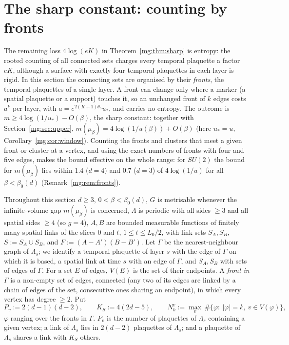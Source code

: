 \documentclass[11pt,a4paper]{article}
\theoremstyle{definition}
\theoremstyle{remark}
\begin{document}
\section{The sharp constant: counting by fronts}\label{mg:sec:fronts}

The remaining loss $4\log(eK)$ in Theorem~\ref{mg:thm:sharp} is entropy: the rooted counting of all connected sets charges every
temporal plaquette a factor $eK$, although a surface with exactly four temporal plaquettes in each layer is rigid. In this section the
connecting sets are organised by their \emph{fronts}, the temporal plaquettes of a single layer. A front can change only where a marker (a
spatial plaquette or a support) touches it, so an unchanged front of $k$ edges costs $a^k$ per layer, with $a=e^{2(K+1)\theta_5}u_*$, and
carries no entropy. The outcome is $m\ge4\log(1/u_*)-O(\beta)$, the sharp constant: together with Section~\ref{mg:sec:upper},
$m(\mu_\beta)=4\log(1/u(\beta))+O(\beta)$ (here $u_*=u$, Corollary~\ref{mg:cor:window}). Counting the fronts and clusters that meet a given
front or cluster at a vertex, and using the exact numbers of fronts with four and five edges, makes the bound effective on the whole
range: for $SU(2)$ the bound for $m(\mu_\beta)$ lies within $1.4$ ($d=4$) and $0.7$ ($d=3$) of $4\log(1/u)$ for all $\beta<\beta_0(d)$
(Remark~\ref{mg:rem:fronts}).

Throughout this section $d\ge3$, $0<\beta<\beta_0(d)$, $G$ is metrisable whenever the infinite-volume gap $m(\mu_\beta)$ is concerned,
$\Lambda$ is periodic with all sides $\ge3$ and all spatial sides $\ge4$ (so $g=4$), $A,B$ are bounded measurable functions of finitely many
spatial links of the slices $0$ and $t$, $1\le t\le L_0/2$, with link sets $S_A,S_B$, $S:=S_A\cup S_B$, and $F:=(A-A')(B-B')$. Let $\Gamma$ be the
nearest-neighbour graph of $\Lambda_s$; we identify a temporal plaquette of layer $s$ with the edge of $\Gamma$ on which it is based, a spatial
link at time $s$ with an edge of $\Gamma$, and $S_A,S_B$ with sets of edges of $\Gamma$. For a set $E$ of edges, $V(E)$ is the set of their
endpoints. A \emph{front in $\Gamma$} is a non-empty set of edges, connected (any two of its edges are linked by a chain of edges of the set,
consecutive ones sharing an endpoint), in which every vertex has degree $\ge2$. Put
\[
P_v:=2(d-1)(d-2),\qquad K_S:=4(2d-5),\qquad N^v_k:=\max_v\,\#\{\varphi:\ |\varphi|=k,\ v\in V(\varphi)\},
\]
$\varphi$ ranging over the fronts in $\Gamma$.
$P_v$ is the number of plaquettes of $\Lambda_s$ containing a given vertex; a link of $\Lambda_s$ lies in $2(d-2)$ plaquettes of $\Lambda_s$;
and a plaquette of $\Lambda_s$ shares a link with $K_S$ others.
\end{document}
